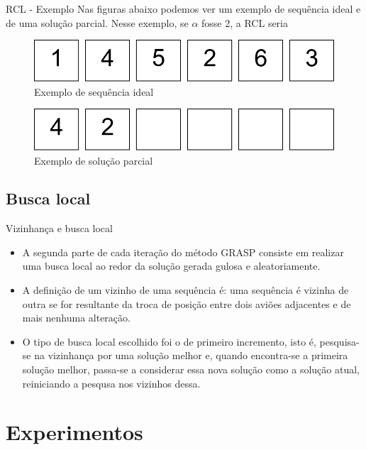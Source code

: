 \documentclass[xcolor=dvipsnames]{beamer}
\begin{document}
\begin{frame}{RCL - Exemplo}
 Nas figuras abaixo podemos ver um exemplo de sequência ideal e de uma solução parcial. Nesse exemplo, se $\alpha$ fosse 2, a RCL seria 
\begin{figure}[h]
      \includegraphics[scale=0.4]{seq.pdf}
     \caption{Exemplo de sequência ideal}
     \label{im4}
\end{figure}
\begin{figure}[h]
      \includegraphics[scale=0.4]{solpar.pdf}
     \caption{Exemplo de solução parcial}
     \label{im5}
\end{figure}
\end{frame}

\subsection{Busca local}

\begin{frame}{Vizinhança e busca local}
 \begin{itemize}[<+-| alert@+>]
  \item{A segunda parte de cada iteração do método GRASP consiste em realizar uma busca local ao redor da solução gerada gulosa e aleatoriamente.}
  \item{A definição de um vizinho de uma sequência é: uma sequência é vizinha de outra se for resultante da troca de posição entre dois aviões adjacentes e de mais nenhuma alteração.}
  \item{O tipo de busca local escolhido foi o de primeiro incremento, isto é, pesquisa-se na vizinhança por uma solução melhor e, quando encontra-se a primeira solução melhor, passa-se a considerar essa nova solução como a solução atual, reiniciando a pesqusa nos vizinhos dessa.} 
\end{itemize}  
\end{frame}

\section{Experimentos}
\end{document}
